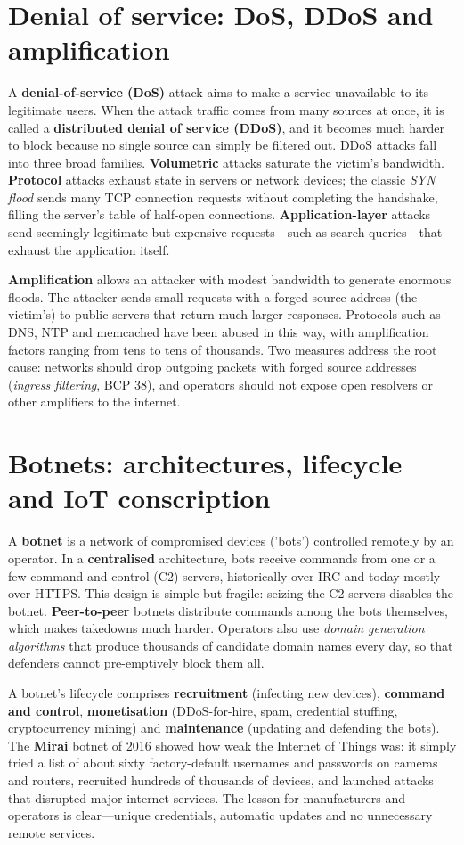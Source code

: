 \section{Denial of service: DoS, DDoS and amplification}\label{sec:6.1}
A \textbf{denial-of-service (DoS)} attack aims to make a service unavailable to its legitimate users. When the attack traffic comes from many sources at once, it is called a \textbf{distributed denial of service (DDoS)}, and it becomes much harder to block because no single source can simply be filtered out. DDoS attacks fall into three broad families. \textbf{Volumetric} attacks saturate the victim's bandwidth. \textbf{Protocol} attacks exhaust state in servers or network devices; the classic \emph{SYN flood} sends many TCP connection requests without completing the handshake, filling the server's table of half-open connections. \textbf{Application-layer} attacks send seemingly legitimate but expensive requests—such as search queries—that exhaust the application itself.

\textbf{Amplification} allows an attacker with modest bandwidth to generate enormous floods. The attacker sends small requests with a forged source address (the victim's) to public servers that return much larger responses. Protocols such as DNS, NTP and memcached have been abused in this way, with amplification factors ranging from tens to tens of thousands. Two measures address the root cause: networks should drop outgoing packets with forged source addresses (\emph{ingress filtering}, BCP 38), and operators should not expose open resolvers or other amplifiers to the internet.

\section{Botnets: architectures, lifecycle and IoT conscription}\label{sec:6.2}
A \textbf{botnet} is a network of compromised devices ('bots') controlled remotely by an operator. In a \textbf{centralised} architecture, bots receive commands from one or a few command-and-control (C2) servers, historically over IRC and today mostly over HTTPS. This design is simple but fragile: seizing the C2 servers disables the botnet. \textbf{Peer-to-peer} botnets distribute commands among the bots themselves, which makes takedowns much harder. Operators also use \emph{domain generation algorithms} that produce thousands of candidate domain names every day, so that defenders cannot pre-emptively block them all.

A botnet's lifecycle comprises \textbf{recruitment} (infecting new devices), \textbf{command and control}, \textbf{monetisation} (DDoS-for-hire, spam, credential stuffing, cryptocurrency mining) and \textbf{maintenance} (updating and defending the bots). The \textbf{Mirai} botnet of 2016 showed how weak the Internet of Things was: it simply tried a list of about sixty factory-default usernames and passwords on cameras and routers, recruited hundreds of thousands of devices, and launched attacks that disrupted major internet services. The lesson for manufacturers and operators is clear—unique credentials, automatic updates and no unnecessary remote services.

